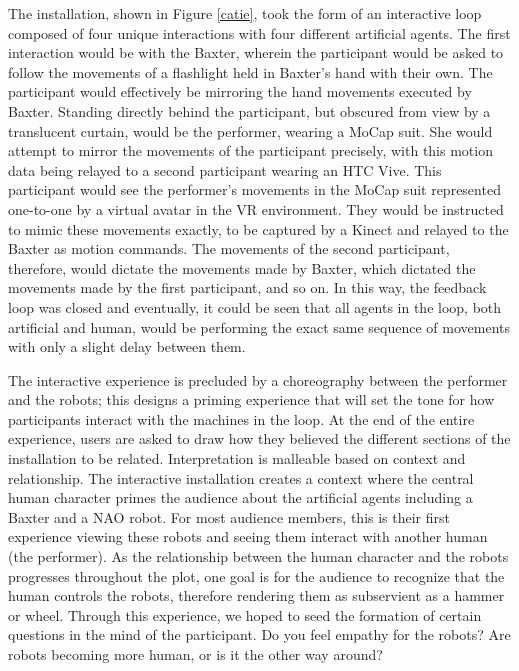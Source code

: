 \documentclass[arts,article,submit,moreauthors,pdftex,10pt,a4paper]{mdpi}
\begin{document}
The installation, shown in Figure \ref{catie}, took the form of an interactive loop composed of four unique interactions with four different artificial agents. The first interaction would be with the Baxter, wherein the participant would be asked to follow the movements of a flashlight held in Baxter’s hand with their own. The participant would effectively be mirroring the hand movements executed by Baxter. Standing directly behind the participant, but obscured from view by a translucent curtain, would be the performer, wearing a MoCap suit. She would attempt to mirror the movements of the participant precisely, with this motion data being relayed to a second participant wearing an HTC Vive. This participant would see the performer's movements in the MoCap suit represented one-to-one by a virtual avatar in the VR environment. They would be instructed to mimic these movements exactly, to be captured by a Kinect and relayed to the Baxter as motion commands. The movements of the second participant, therefore, would dictate the movements made by Baxter, which dictated the movements made by the first participant, and so on. In this way, the feedback loop was closed and eventually, it could be seen that all agents in the loop, both artificial and human, would be performing the exact same sequence of movements with only a slight delay between them. 

The interactive experience is precluded by a choreography between the performer and the robots; this designs a priming experience that will set the tone for how participants interact with the machines in the loop. At the end of the entire experience, users are asked to draw how they believed the different sections of the installation to be related. %
Interpretation
 is malleable based on context and relationship.  The interactive  installation creates a context where the central human character primes the audience about the artificial agents including a Baxter and a NAO robot.  For most audience members, this is their
 first experience viewing these robots and seeing them interact with another human (the performer).  As the relationship between the human character and the robots progresses throughout the plot, one goal is for the audience to recognize that the human controls
 the robots, therefore rendering them as subservient as a hammer or wheel. 
Through this experience, we hoped to seed the formation of certain questions in the mind of the participant. Do you feel empathy for the robots? Are robots becoming more human, or is it the other way around? 
\end{document}
